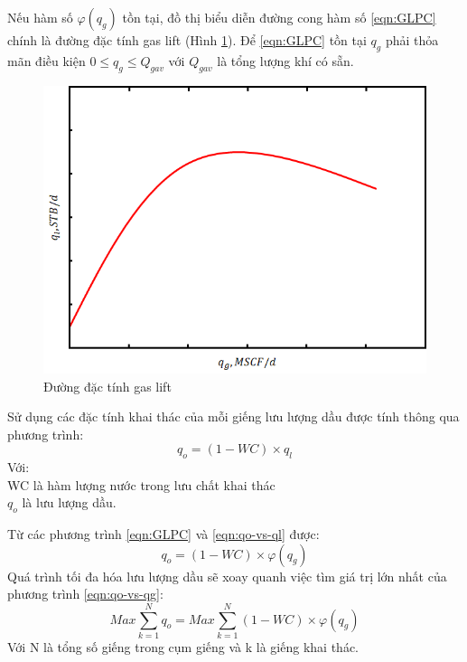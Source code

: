 \documentclass[12pt,a4paper]{report}
\begin{document}
Nếu hàm số $\varphi(q_g)$ tồn tại, đồ thị biểu diễn đường cong hàm số \ref{eqn:GLPC} chính là đường đặc tính gas lift (Hình \ref{fig:glpc}). Để \ref{eqn:GLPC} tồn tại $q_g$ phải thỏa mãn điều kiện $0 \leq q_g \leq Q_{gav}$ với $Q_{gav}$ là tổng lượng khí có sẵn.

	\begin{figure}[h]
		\centering
		\includegraphics[scale=.6]{fig/glpc.png}
		\caption{Đường đặc tính gas lift}
		\label{fig:glpc}
	\end{figure}

Sử dụng các đặc tính khai thác của mỗi giếng lưu lượng dầu được tính thông qua phương trình:
	\begin{equation}\label{eqn:qo-vs-ql}
		q_o = (1 - WC) \times q_l
	\end{equation}
Với:\\
\hspace*{1cm}WC là hàm lượng nước trong lưu chất khai thác\\
\hspace*{1cm}$q_o$ là lưu lượng dầu.

Từ các phương trình \ref{eqn:GLPC} và \ref{eqn:qo-vs-ql} được:
	\begin{equation}\label{eqn:qo-vs-qg}
		q_o = (1 - WC) \times \varphi(q_g)
	\end{equation}
Quá trình tối đa hóa lưu lượng dầu sẽ xoay quanh việc tìm giá trị lớn nhất của phương trình \ref{eqn:qo-vs-qg}:
	\begin{equation}\label{eqn:max-qo}
		Max\sum_{k=1}^Nq_o = Max\sum_{k=1}^N(1 - WC) \times \varphi(q_g)
	\end{equation}
Với N là tổng số giếng trong cụm giếng và k là giếng khai thác.\\
\end{document}
